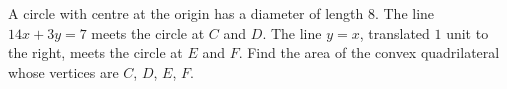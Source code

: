 A circle with centre at the origin has a diameter of length $8$. The line $14x+3y=7$ meets the circle at $C$ and $D$. The line $y=x$, translated $1$ unit to the right, meets the circle at $E$ and $F$. Find the area of the convex quadrilateral whose vertices are $C$, $D$, $E$, $F$.
